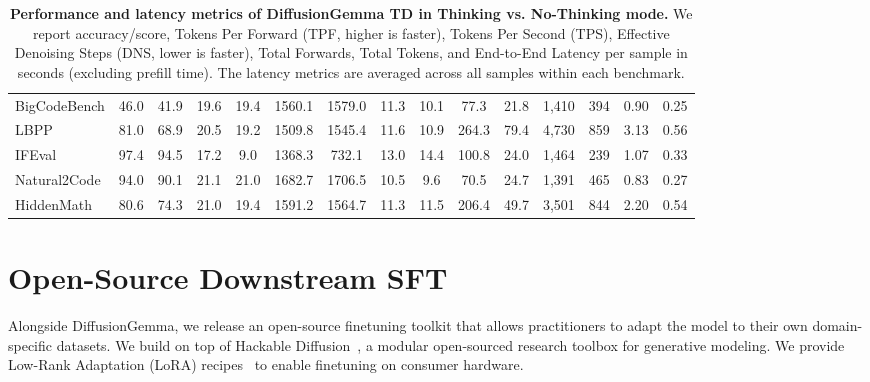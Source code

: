 \documentclass[11pt, a4paper, logo, copyright, gdm]{google}
\begin{document}
\begin{landscape}
\begin{table}[t!]
\begin{tabular}{l|cc|cc|cc|cc|cc|cc|cc}
BigCodeBench & 46.0 & 41.9 & 19.6 & 19.4 & 1560.1 & 1579.0 & 11.3 & 10.1 & 77.3 & 21.8 & 1,410 & 394 & 0.90 & 0.25 \\
LBPP & 81.0 & 68.9 & 20.5 & 19.2 & 1509.8 & 1545.4 & 11.6 & 10.9 & 264.3 & 79.4 & 4,730 & 859 & 3.13 & 0.56 \\
IFEval & 97.4 & 94.5 & 17.2 & 9.0 & 1368.3 & 732.1 & 13.0 & 14.4 & 100.8 & 24.0 & 1,464 & 239 & 1.07 & 0.33 \\
Natural2Code & 94.0 & 90.1 & 21.1 & 21.0 & 1682.7 & 1706.5 & 10.5 & 9.6 & 70.5 & 24.7 & 1,391 & 465 & 0.83 & 0.27 \\
HiddenMath & 80.6 & 74.3 & 21.0 & 19.4 & 1591.2 & 1564.7 & 11.3 & 11.5 & 206.4 & 49.7 & 3,501 & 844 & 2.20 & 0.54 \\
\bottomrule
\end{tabular}
\caption{\textbf{Performance and latency metrics of DiffusionGemma TD in Thinking vs. No-Thinking mode.} We report accuracy/score, Tokens Per Forward (TPF, higher is faster), Tokens Per Second (TPS), Effective Denoising Steps (DNS, lower is faster), Total Forwards, Total Tokens, and End-to-End Latency per sample in seconds (excluding prefill time). The latency metrics are averaged across all samples within each benchmark.}
\label{tab:dg_td_latency}
\end{table}

\end{landscape}


\section{Open-Source Downstream SFT}\label{sec:downstream_sft}

Alongside DiffusionGemma, we release an open-source finetuning toolkit that allows practitioners to adapt the model to their own domain-specific datasets. We build on top of Hackable Diffusion~\citep{hackable_diffusion2026github}, a modular open-sourced research toolbox for generative modeling.
We provide Low-Rank Adaptation (LoRA) recipes~\citep{hu2021loralowrankadaptationlarge} to enable finetuning on consumer hardware.
\end{document}
